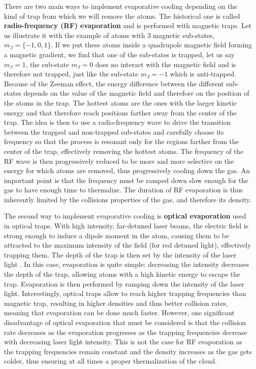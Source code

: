 There are two main ways to implement evaporative cooling depending on the kind of trap from which we will remove the atoms. The historical one is called \textbf{radio-frequency (RF) evaporation} \cite{dos2001penning,ketterle1996evaporative,robert2001bose} and is performed with magnetic traps. Let us illustrate it with the example of atoms with 3 magnetic sub-states, $m_J=\{-1,0,1\}$. If we put these atoms inside a quadrupole magnetic field forming a magnetic gradient, we find that one of the sub-states is trapped, let us say $m_J=1$, the sub-state $m_J=0$ does no interact with the magnetic field and is therefore not trapped, just like the sub-state $m_J=-1$ which is anti-trapped. Because of the Zeeman effect, the energy difference between the different sub-states depends on the value of the magnetic field and therefore on the position of the atoms in the trap. The hottest atoms are the ones with the larger kinetic energy and that therefore reach positions farther away from the center of the trap. The idea is then to use a radio-frequency wave to drive the transition between the trapped and non-trapped sub-states and carefully choose its frequency so that the process is resonant only for the regions farther from the center of the trap, effectively removing the hottest atoms. The frequency of the RF wave is then progressively reduced to be more and more selective on the energy for which atoms are removed, thus progressively cooling down the gas. An important point is that the frequency must be ramped down slow enough for the gas to have enough time to thermalize. The duration of RF evaporation is thus inherently limited by the collisions properties of the gas, and therefore its density.

The second way to implement evaporative cooling is \textbf{optical evaporation} used in optical traps. With high intensity, far-detuned laser beams, the electric field is strong enough to induce a dipole moment in the atom, causing them to be attracted to the maximum intensity of the field (for red detuned light), effectively trapping them. The depth of the trap is then set by the intensity of the laser light \cite{grimm2000optical}. In this case, evaporation is quite simple: decreasing the intensity decreases the depth of the trap, allowing atoms with a high kinetic energy to escape the trap. Evaporation is then performed by ramping down the intensity of the laser light. Interestingly, optical traps allow to reach higher trapping frequencies than magnetic trap, resulting in higher densities and thus better collision rates, meaning that evaporation can be done much faster. However, one significant disadvantage of optical evaporation that must be considered is that the collision rate decreases as the evaporation progresses as the trapping frequencies decrease with decreasing laser light intensity. This is not the case for RF evaporation as the trapping frequencies remain constant and the density increases as the gas gets colder, thus ensuring at all times a proper thermalization of the cloud.

